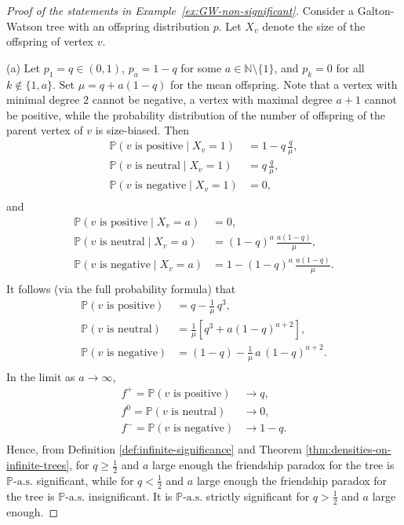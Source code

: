 \documentclass[11pt]{article}
\numberwithin{equation}{section}
\theoremstyle{plain}
\newcommand{\N}{\mathbb N}
\newcommand{\PP}{\mathbb{P}}
\begin{document}
\begin{proof}[Proof of the statements in Example~\ref{ex:GW-non-significant}]
Consider a Galton-Watson tree with an offspring distribution $p$. Let $X_v$ denote the size of the offspring of vertex $v$.

\medskip\noindent 
(a) Let $p_1 = q \in (0,1)$, $p_a = 1-q$ for some $a \in \N\setminus\{1\}$, and $p_k = 0$ for all $k \notin \{1,a\}$. Set $\mu = q + a(1-q)$ for the mean offspring. Note that a vertex with minimal degree $2$ cannot be negative, a vertex with maximal degree $a+1$ cannot be positive, while the probability distribution of the number of offspring of the parent vertex of $v$ is size-biased. Then
\[
\begin{aligned}
\PP(v \text{ is positive} \mid X_v = 1) &= 1-q\,\frac{q}{\mu},\\
\PP(v \text{ is neutral} \mid X_v = 1) &= q\,\frac{q}{\mu},\\
\PP(v \text{ is negative} \mid X_v = 1) &= 0,\\
\end{aligned}
\]   
and 
\[
\begin{aligned}
\PP(v \text{ is positive} \mid X_v = a) &= 0,\\
\PP(v \text{ is neutral} \mid X_v = a) &= (1-q)^a\,\frac{a(1-q)}{\mu},\\
\PP(v \text{ is negative} \mid X_v = a) &= 1-(1-q)^a\,\frac{a(1-q)}{\mu}.\\
\end{aligned}
\]   
It follows (via the full probability formula) that
\[
\begin{aligned}
\PP(v \text{ is positive}) &= q - \frac{1}{\mu}\,q^3,\\
\PP(v \text{ is neutral}) &= \frac{1}{\mu}[q^3 + a (1-q)^{a+2}],\\
\PP(v \text{ is negative}) &= (1-q) - \frac{1}{\mu}\,a\,(1-q)^{a+2}.\\
\end{aligned}
\]   
In the limit as $a\to\infty$,
\[
\begin{aligned}
f^+ =\PP(v \text{ is positive}) &\to q,\\
f^0 = \PP(v \text{ is neutral}) &\to 0,\\
f^- = \PP(v \text{ is negative}) &\to 1-q.\\
\end{aligned}
\]   
Hence, from Definition \ref{def:infinite-significance} and Theorem \ref{thm:densities-on-infinite-trees}, for $q\geq\tfrac12$ and $a$ large enough the friendship paradox for the tree is $\PP\text{-}\mathrm{a.s.}$ significant, while for $q<\tfrac12$ and $a$ large enough the friendship paradox for the tree is $\PP\text{-}\mathrm{a.s.}$ insignificant. It is $\PP\text{-}\mathrm{a.s.}$ strictly significant for $q>\tfrac12$ and $a$ large enough.


\end{proof}
\end{document}
